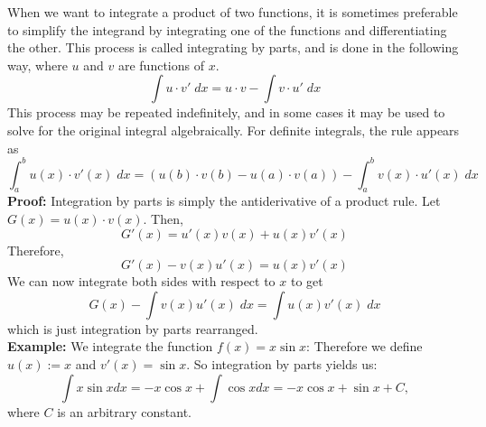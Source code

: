 \documentclass[12pt]{article}
\begin{document}
When we want to integrate a product of two functions, it is sometimes preferable to simplify the integrand by integrating one of the functions and differentiating the other. This process is called integrating by parts, and is done in the following way, where $u$ and $v$ are functions of $x$.
$$\int u\cdot v'\; dx = u\cdot v - \int v\cdot u'\; dx$$
This process may be repeated indefinitely, and in some cases it may be used to solve for the original integral algebraically. For definite integrals, the rule appears as
$$\int_a^b u(x)\cdot v'(x)\; dx = (u(b)\cdot v(b)-u(a)\cdot v(a)) - \int_a^b v(x)\cdot u'(x)\; dx$$
\textbf{Proof:}
Integration by parts is simply the antiderivative of a product rule. Let $G(x)=u(x)\cdot v(x)$. Then,
$$G'(x) = u'(x)v(x) + u(x)v'(x)$$
Therefore,
$$G'(x) - v(x)u'(x) = u(x)v'(x)$$
We can now integrate both sides with respect to $x$ to get
$$G(x) - \int v(x)u'(x)\; dx = \int u(x)v'(x)\; dx$$
which is just integration by parts rearranged. \\
\textbf{Example:} We integrate the function $f(x)=x\sin x$: Therefore we define $u(x):=x$ and $v'(x)=\sin x$. So integration by parts yields us:
$$\int x\sin x\mathit{dx}=-x\cos x+\int\cos x\mathit{dx}=-x\cos x+\sin x+C,$$
where $C$ is an arbitrary constant.
\end{document}
